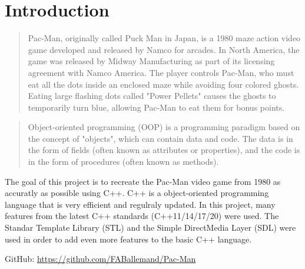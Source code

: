 \section{Introduction}

\begin{quote}
    Pac-Man, originally called Puck Man in Japan, is a 1980 maze action video game developed and released by Namco for arcades. In North America, the game was released by Midway Manufacturing as part of its licensing agreement with Namco America. The player controls Pac-Man, who must eat all the dots inside an enclosed maze while avoiding four colored ghosts. Eating large flashing dots called "Power Pellets" causes the ghosts to temporarily turn blue, allowing Pac-Man to eat them for bonus points.\cite{pacman_wiki}
\end{quote}

\begin{quote}
    Object-oriented programming (OOP) is a programming paradigm based on the concept of "objects", which can contain data and code. The data is in the form of fields (often known as attributes or properties), and the code is in the form of procedures (often known as methods).\cite{oop_wiki}
\end{quote}

The goal of this project is to recreate the Pac-Man video game from 1980 as accuratly as possible using C++.
C++ is a object-oriented programming language that is very efficient and regulraly updated. In this project, many features from the latest C++ standards (C++11/14/17/20) were used.
The Standar Template Library (STL)\cite{stl_wiki} and the Simple DirectMedia Layer (SDL)\cite{sdl} were used in order to add even more features to the basic C++ language.

GitHub: \url{https://github.com/FABallemand/Pac-Man}